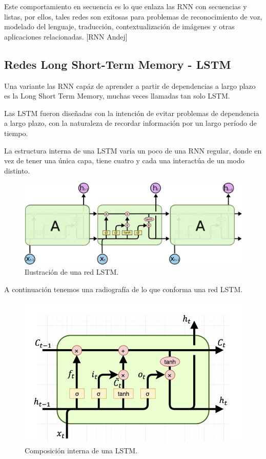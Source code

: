 \documentclass[12pt, letterpaper]{article}
\begin{document}
    Este comportamiento en secuencia es lo que enlaza las RNN con secuencias y listas, por ellos, tales redes son exitosas para problemas de reconocimiento de voz, modelado del lenguaje, traducción, contextualización de imágenes y otras aplicaciones relacionadas.
    [RNN Andej]

    \subsection{Redes Long Short-Term Memory - LSTM}
    Una variante las RNN capáz de aprender a partir de dependencias a largo plazo es la Long Short Term Memory, muchas veces llamadas tan solo LSTM.
    
    Las LSTM fueron diseñadas con la intención de evitar problemas de dependencia a largo plazo, con la naturaleza de recordar información por un largo período de tiempo.
    
    La estructura interna de una LSTM varía un poco de una RNN regular, donde en vez de tener una única capa, tiene cuatro y cada una interactúa de un modo distinto.

        \begin{figure}[H]
            \centering
            \includegraphics[width=\linewidth]{img/LSTM3-chain.png}
            \caption{Ilustración de una red LSTM.}
        \end{figure}

        A continuación tenemos una radiografía de lo que conforma una red LSTM.
        \begin{figure}[H]
            \centering
            \includegraphics[width=\linewidth]{img/LSTM3-cell-A.png}
            \caption{Composición interna de una LSTM.}
        \end{figure}
\end{document}
